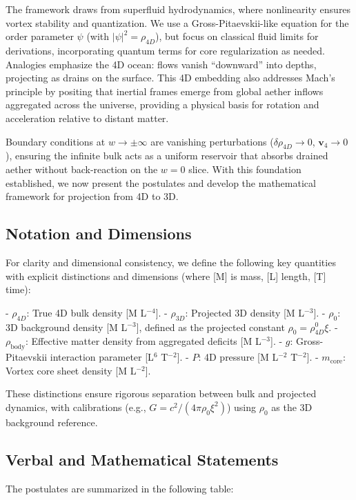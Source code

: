 \documentclass{article}
\begin{document}
The framework draws from superfluid hydrodynamics, where nonlinearity ensures vortex stability and quantization. We use a Gross-Pitaevskii-like equation for the order parameter $\psi$ (with $|\psi|^2 = \rho_{4D}$), but focus on classical fluid limits for derivations, incorporating quantum terms for core regularization as needed. Analogies emphasize the 4D ocean: flows vanish ``downward'' into depths, projecting as drains on the surface. This 4D embedding also addresses Mach's principle by positing that inertial frames emerge from global aether inflows aggregated across the universe, providing a physical basis for rotation and acceleration relative to distant matter.

Boundary conditions at $w \to \pm \infty$ are vanishing perturbations ($\delta \rho_{4D} \to 0$, $\mathbf{v}_4 \to 0$), ensuring the infinite bulk acts as a uniform reservoir that absorbs drained aether without back-reaction on the $w=0$ slice. With this foundation established, we now present the postulates and develop the mathematical framework for projection from 4D to 3D.

\subsection{Notation and Dimensions}

For clarity and dimensional consistency, we define the following key quantities with explicit distinctions and dimensions (where [M] is mass, [L] length, [T] time):

- $\rho_{4D}$: True 4D bulk density [M L$^{-4}$].
- $\rho_{3D}$: Projected 3D density [M L$^{-3}$].
- $\rho_0$: 3D background density [M L$^{-3}$], defined as the projected constant $\rho_0 = \rho_{4D}^0 \xi$.
- $\rho_{\text{body}}$: Effective matter density from aggregated deficits [M L$^{-3}$].
- $g$: Gross-Pitaevskii interaction parameter [L$^6$ T$^{-2}$].
- $P$: 4D pressure [M L$^{-2}$ T$^{-2}$].
- $m_{\text{core}}$: Vortex core sheet density [M L$^{-2}$].

These distinctions ensure rigorous separation between bulk and projected dynamics, with calibrations (e.g., $G = c^2 / (4\pi \rho_0 \xi^2)$) using $\rho_0$ as the 3D background reference.

\subsection{Verbal and Mathematical Statements}

The postulates are summarized in the following table:
\end{document}
